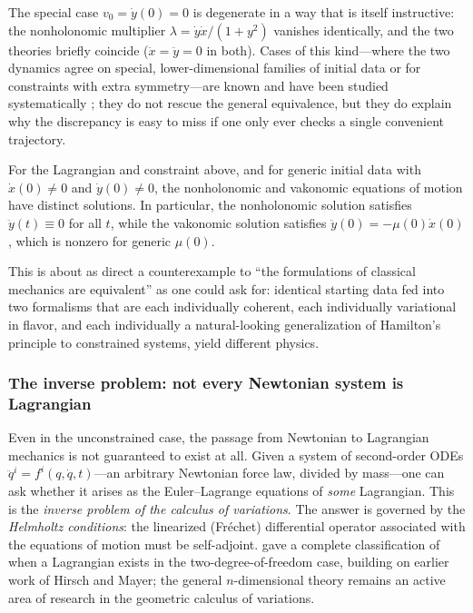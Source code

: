 \begin{remark}
The special case $v_0 = \dot y(0) = 0$ is degenerate in a way that is itself
    instructive: the nonholonomic multiplier $\lambda = \dot y\dot x/(1+y^2)$
    vanishes identically, and the two theories briefly coincide ($\ddot x=\ddot
    y=0$ in both). Cases of this kind---where the two dynamics agree on
    special, lower-dimensional families of initial data or for constraints with
    extra symmetry---are known and have been studied systematically
    \cite{akn2006}; they do not rescue the general equivalence, but they do
    explain why the discrepancy is easy to miss if one only ever checks a
    single convenient trajectory.
\end{remark}

\begin{proposition}
\label{prop:nonequiv}
For the Lagrangian and constraint above, and for generic initial data with
    $\dot x(0)\neq 0$ and $\dot y(0)\neq 0$, the nonholonomic and vakonomic
    equations of motion have distinct solutions. In particular, the
    nonholonomic solution satisfies $\ddot y(t) \equiv 0$ for all $t$, while
    the vakonomic solution satisfies $\ddot y(0) = -\mu(0)\dot x(0)$, which is
    nonzero for generic $\mu(0)$.
\end{proposition}

This is about as direct a counterexample to ``the formulations of classical
mechanics are equivalent'' as one could ask for: identical starting data fed
into two formalisms that are each individually coherent, each individually
variational in flavor, and each individually a natural-looking generalization
of Hamilton's principle to constrained systems, yield different physics.

\subsubsection{The inverse problem: not every Newtonian system is Lagrangian}
\label{helmholtz}

Even in the unconstrained case, the passage from Newtonian to Lagrangian
mechanics is not guaranteed to exist at all. Given a system of second-order
ODEs $\ddot q^i = f^i(q,\dot q,t)$---an arbitrary Newtonian force law, divided
by mass---one can ask whether it arises as the Euler--Lagrange equations of
\emph{some} Lagrangian. This is the \emph{inverse problem of the calculus of
variations}. The answer is governed by the \emph{Helmholtz conditions}: the
linearized (Fr\'echet) differential operator associated with the equations of
motion must be self-adjoint. \cite{douglas1941} gave a complete classification
of when a Lagrangian exists in the two-degree-of-freedom case, building on
earlier work of Hirsch and Mayer; the general $n$-dimensional theory remains an
active area of research in the geometric calculus of variations.

